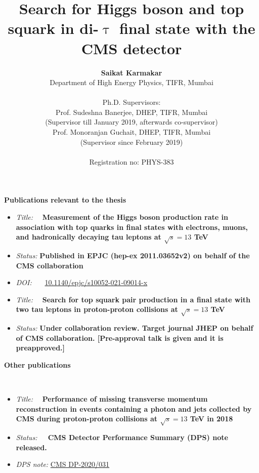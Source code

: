 \documentclass[12pt, a4paper]{article}
\title{\textbf{Search for Higgs boson and top squark in di-$\uptau$ final state with the CMS detector}}
\author{\textbf{Saikat Karmakar}\\
Department of High Energy Physics, TIFR, Mumbai\\
\\
Ph.D. Supervisors:\\
Prof. Sudeshna Banerjee, DHEP, TIFR, Mumbai \\
(Supervisor till January 2019, afterwards co-supervisor)\\
Prof. Monoranjan Guchait, DHEP, TIFR, Mumbai\\
 (Supervisor since February 2019)\\
 \\
Registration no: PHYS-383}
\date{}
\begin{document}
\begin{titlepage}
\maketitle
\thispagestyle{empty}
\end{titlepage}

\begin{itemize}
{\huge
\item[\textbf{1}]\textbf{ Publications relevant to the thesis}}
	\begin{itemize}
		\item[1.]\textit{Title:} ~~\textbf{Measurement of the Higgs boson production rate in association with top quarks in final states with electrons, muons, and hadronically decaying tau leptons at $\sqrt{s}=13$ TeV}
		\item[] \textit{Status:} \textbf{Published in EPJC (hep-ex 2011.03652v2) on behalf of the CMS collaboration}
		\item[]\textit{DOI:}~~~ \href{https://link.springer.com/article/10.1140/epjc/s10052-021-09014-x}{	10.1140/epjc/s10052-021-09014-x} 

		\item[2.] \textit{Title:}~~ \textbf{Search for top squark pair production in a final
			state with two tau leptons in proton-proton collisions at $\sqrt{s} = 13$ TeV}
		\item[]\textit{Status:} \textbf{Under collaboration review. Target journal JHEP on behalf of CMS collaboration. [Pre-approval talk is given and it is preapproved.]}
	\end{itemize}

\vspace{0.5cm}
{\huge
	\item[\textbf{2}]\textbf{ Other publications}}\\
		\begin{itemize}
		\item[1.]\textit{Title:}~~ \textbf{Performance of missing transverse momentum reconstruction in events containing a photon and jets collected by CMS during proton-proton collisions at $\sqrt{s} = 13$ TeV in 2018}
		\item[]\textit{Status:}~~~\textbf{CMS Detector Performance Summary (DPS) note released.}
		\item[]\textit{DPS note:} \href{https://cds.cern.ch/record/2723010/files/DP2020_031.pdf}{CMS DP-2020/031}
	\end{itemize}


\end{itemize}
\end{document}
